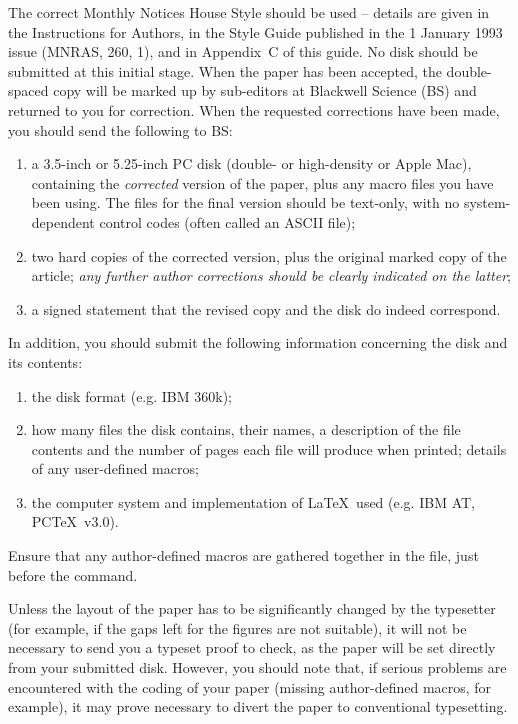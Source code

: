 The correct Monthly Notices House Style should be used -- details are
given in the Instructions for Authors, in the Style Guide published
in the 1 January 1993 issue (\hbox{MNRAS}, 260, 1), and in Appendix~C of
this guide. No disk should be submitted
at this initial stage. When the paper has been accepted, the double-spaced
copy will be marked up by sub-editors at Blackwell Science
(BS) and returned to you for correction. When the requested corrections
have been made, you should send the following to BS:
%
\begin{enumerate}
\item a 3.5-inch or 5.25-inch PC disk (double- or high-density or
  Apple Mac), containing the {\em corrected\/} version of the paper,
  plus any macro files you have been using. The files for the final 
  version should be text-only, with no system-dependent control codes 
  (often called an ASCII file);
\item two hard copies of the corrected version, plus the original marked
  copy of the article; {\em any further author corrections should be
  clearly indicated on the latter\/};
\item a signed statement that the revised copy and the disk do indeed
  correspond.
\end{enumerate}
%
In addition, you should submit the following information concerning the
disk and its contents:
%
\begin{enumerate}
\item the disk format (e.g. IBM 360k);
\item how many files the disk contains, their names,
  a description of the file contents and the number of pages each file
  will produce when printed; details of any user-defined macros;
\item the computer system and implementation of \LaTeX\ used (e.g.
  IBM AT, PC\TeX\ v3.0).
\end{enumerate}
%
Ensure that any author-defined macros are gathered together in the file,
just before the \verb"" command. 

Unless the layout of the paper has to be significantly changed by the
typesetter (for example, if the gaps left for the figures are not
suitable), it will not be necessary to send you a typeset proof to check,
as the paper will be set directly from your submitted disk. However, you
should note that, if serious problems are encountered with the coding of
your paper (missing author-defined macros, for example), it may prove
necessary to divert the paper to conventional typesetting.

